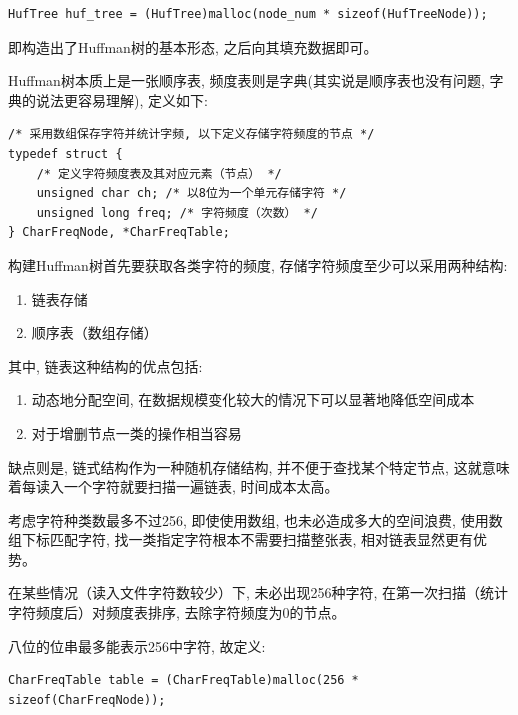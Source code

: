 \documentclass{ctexart}
\begin{document}
{\setmainfont{Courier New Bold}              
\begin{lstlisting}
HufTree huf_tree = (HufTree)malloc(node_num * sizeof(HufTreeNode));
\end{lstlisting}}

即构造出了Huffman树的基本形态, 之后向其填充数据即可。

Huffman树本质上是一张顺序表, 频度表则是字典(其实说是顺序表也没有问题, 字典的说法更容易理解), 定义如下:

{\setmainfont{Courier New Bold}              
\begin{lstlisting}
/* 采用数组保存字符并统计字频, 以下定义存储字符频度的节点 */
typedef struct {
    /* 定义字符频度表及其对应元素（节点） */
    unsigned char ch; /* 以8位为一个单元存储字符 */
    unsigned long freq; /* 字符频度（次数） */
} CharFreqNode, *CharFreqTable;
\end{lstlisting}}

构建Huffman树首先要获取各类字符的频度, 存储字符频度至少可以采用两种结构:

\begin{enumerate}
\def\labelenumi{\arabic{enumi}.}
\item
  链表存储
\item
  顺序表（数组存储）
\end{enumerate}

其中, 链表这种结构的优点包括:

\begin{enumerate}
\def\labelenumi{\arabic{enumi}.}
\item
  动态地分配空间, 在数据规模变化较大的情况下可以显著地降低空间成本
\item
  对于增删节点一类的操作相当容易
\end{enumerate}

缺点则是, 链式结构作为一种随机存储结构, 并不便于查找某个特定节点, 这就意味着每读入一个字符就要扫描一遍链表, 时间成本太高。

考虑字符种类数最多不过256, 即使使用数组, 也未必造成多大的空间浪费, 使用数组下标匹配字符, 找一类指定字符根本不需要扫描整张表, 相对链表显然更有优势。

在某些情况（读入文件字符数较少）下, 未必出现256种字符, 在第一次扫描（统计字符频度后）对频度表排序, 去除字符频度为0的节点。

八位的位串最多能表示256中字符, 故定义:

{\setmainfont{Courier New Bold}              
\begin{lstlisting}
CharFreqTable table = (CharFreqTable)malloc(256 * sizeof(CharFreqNode));
\end{lstlisting}}
\end{document}
